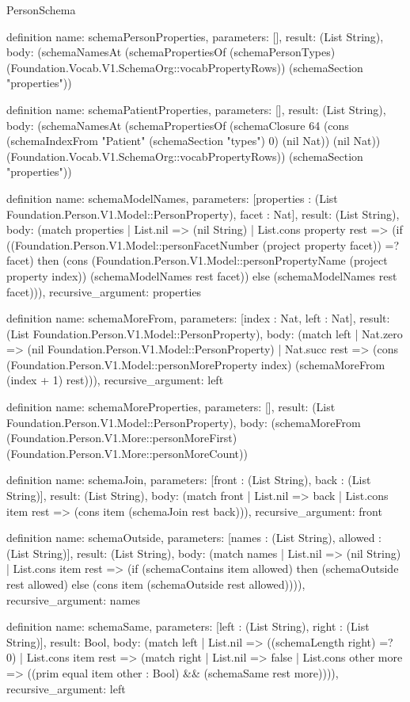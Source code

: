 \begin{lexlean}{PersonSchema}
\begin{semanticmodule}
definition{
  name: schemaPersonProperties,
  parameters: [],
  result: (List String),
  body: (schemaNamesAt (schemaPropertiesOf (schemaPersonTypes) (Foundation.Vocab.V1.SchemaOrg::vocabPropertyRows)) (schemaSection "properties"))
}

definition{
  name: schemaPatientProperties,
  parameters: [],
  result: (List String),
  body: (schemaNamesAt (schemaPropertiesOf (schemaClosure 64 (cons (schemaIndexFrom "Patient" (schemaSection "types") 0) (nil Nat)) (nil Nat)) (Foundation.Vocab.V1.SchemaOrg::vocabPropertyRows)) (schemaSection "properties"))
}

definition{
  name: schemaModelNames,
  parameters: [properties : (List Foundation.Person.V1.Model::PersonProperty), facet : Nat],
  result: (List String),
  body: (match properties
    | List.nil => (nil String)
    | List.cons property rest => (if ((Foundation.Person.V1.Model::personFacetNumber (project property facet)) =? facet) then (cons (Foundation.Person.V1.Model::personPropertyName (project property index)) (schemaModelNames rest facet)) else (schemaModelNames rest facet))),
  recursive_argument: properties
}

definition{
  name: schemaMoreFrom,
  parameters: [index : Nat, left : Nat],
  result: (List Foundation.Person.V1.Model::PersonProperty),
  body: (match left
    | Nat.zero => (nil Foundation.Person.V1.Model::PersonProperty)
    | Nat.succ rest => (cons (Foundation.Person.V1.Model::personMoreProperty index) (schemaMoreFrom (index + 1) rest))),
  recursive_argument: left
}

definition{
  name: schemaMoreProperties,
  parameters: [],
  result: (List Foundation.Person.V1.Model::PersonProperty),
  body: (schemaMoreFrom (Foundation.Person.V1.More::personMoreFirst) (Foundation.Person.V1.More::personMoreCount))
}

definition{
  name: schemaJoin,
  parameters: [front : (List String), back : (List String)],
  result: (List String),
  body: (match front
    | List.nil => back
    | List.cons item rest => (cons item (schemaJoin rest back))),
  recursive_argument: front
}

definition{
  name: schemaOutside,
  parameters: [names : (List String), allowed : (List String)],
  result: (List String),
  body: (match names
    | List.nil => (nil String)
    | List.cons item rest => (if (schemaContains item allowed) then (schemaOutside rest allowed) else (cons item (schemaOutside rest allowed)))),
  recursive_argument: names
}

definition{
  name: schemaSame,
  parameters: [left : (List String), right : (List String)],
  result: Bool,
  body: (match left
    | List.nil => ((schemaLength right) =? 0)
    | List.cons item rest => (match right
      | List.nil => false
      | List.cons other more => ((prim equal item other : Bool) && (schemaSame rest more)))),
  recursive_argument: left
}
\end{semanticmodule}
\end{lexlean}
